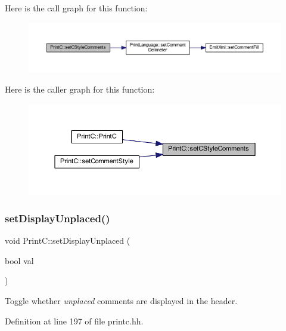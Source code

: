 Here is the call graph for this function\+:
\nopagebreak
\begin{figure}[H]
\begin{center}
\leavevmode
\includegraphics[width=350pt]{class_print_c_af5fb955a22b473013a2e04f69bc7715e_cgraph}
\end{center}
\end{figure}
Here is the caller graph for this function\+:
\nopagebreak
\begin{figure}[H]
\begin{center}
\leavevmode
\includegraphics[width=350pt]{class_print_c_af5fb955a22b473013a2e04f69bc7715e_icgraph}
\end{center}
\end{figure}
\mbox{\label{class_print_c_ae3479ded43276fac1cafa2a599bd6cd1}} 
\subsubsection{\texorpdfstring{setDisplayUnplaced()}{setDisplayUnplaced()}}
{\footnotesize\ttfamily void Print\+C\+::set\+Display\+Unplaced (\begin{DoxyParamCaption}\item[{bool}]{val }\end{DoxyParamCaption})\hspace{0.3cm}{\ttfamily [inline]}}



Toggle whether {\itshape unplaced} comments are displayed in the header. 



Definition at line 197 of file printc.\+hh.

